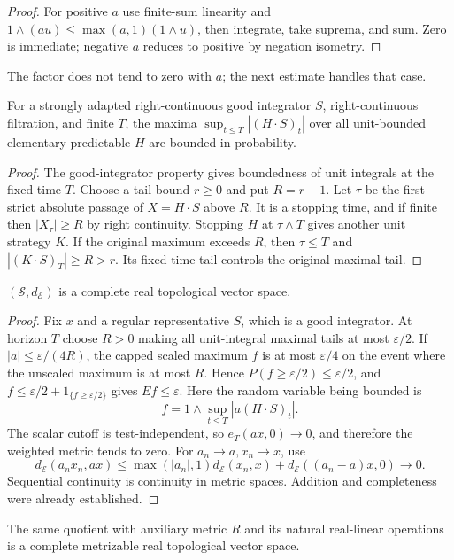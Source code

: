 \begin{proof}
For positive $a$ use finite-sum linearity and
$1\wedge(au)\leq\max(a,1)(1\wedge u)$, then integrate, take suprema, and
sum. Zero is immediate; negative $a$ reduces to positive by negation isometry.
\end{proof}
The factor does not tend to zero with $a$; the next estimate handles that case.
\begin{lemma}
For a strongly adapted right-continuous good integrator $S$, right-continuous
filtration, and finite $T$, the maxima $\sup_{t\leq T}|(H\cdot S)_t|$ over
all unit-bounded elementary predictable $H$ are bounded in probability.
\end{lemma}
\begin{proof}
The good-integrator property gives boundedness of unit integrals at the
fixed time $T$. Choose a tail bound $r\geq0$ and put $R=r+1$.
Let $\tau$ be the first strict absolute passage of $X=H\cdot S$ above $R$.
It is a stopping time, and if finite then $|X_\tau|\geq R$ by right continuity.
Stopping $H$ at $\tau\wedge T$ gives another unit strategy $K$.
If the original maximum exceeds $R$, then $\tau\leq T$ and
$|(K\cdot S)_T|\geq R>r$. Its fixed-time tail controls the original maximal tail.
\end{proof}
\begin{proposition}
$(\mathcal S,d_{\mathcal E})$ is a complete real topological vector space.
\end{proposition}
\begin{proof}
Fix $x$ and a regular representative $S$, which is a good integrator.
At horizon $T$ choose $R>0$ making all unit-integral maximal tails at most
$\varepsilon/2$. If $|a|\leq\varepsilon/(4R)$, the capped scaled maximum $f$
is at most $\varepsilon/4$ on the event where the unscaled maximum is at
most $R$. Hence $P(f\geq\varepsilon/2)\leq\varepsilon/2$, and
$f\leq\varepsilon/2+1_{\{f\geq\varepsilon/2\}}$ gives $Ef\leq\varepsilon$.
Here the random variable being bounded is
\[
 f=1\wedge\sup_{t\leq T}|a(H\cdot S)_t|.
\]
The scalar cutoff is test-independent, so $e_T(ax,0)\to0$, and therefore
the weighted metric tends to zero.
For $a_n\to a,x_n\to x$, use
\[
 d_{\mathcal E}(a_nx_n,ax)\leq
 \max(|a_n|,1)d_{\mathcal E}(x_n,x)+d_{\mathcal E}((a_n-a)x,0)\to0.
\]
Sequential continuity is continuity in metric spaces. Addition and
completeness were already established.
\end{proof}
\begin{proposition}
The same quotient with auxiliary metric $R$ and its natural real-linear
operations is a complete metrizable real topological vector space.
\end{proposition}
